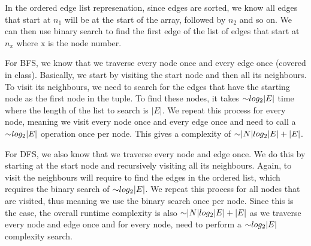 \begin{problem}
\begin{questions}
In the ordered edge list represenation, since edges are sorted, we know all edges that start at $n_1$ will be at the start of the array, followed by $n_2$ and so on. We can then use binary search to find the first edge of the list of edges that start at $n_x$ where x is the node number. 

For BFS, we know that we traverse every node once and every edge once (covered in class). Basically, we start by visiting the start node and then all its neighbours. To visit its neighbours, we need to search for the edges that have the starting node as the first node in the tuple. To find these nodes, it takes $\mathord{\sim}log_2{|E|}$ time where the length of the list to search is $|E|$. We repeat this process for every node, meaning we visit every node once and every edge once and need to call a $\mathord{\sim}log_2{|E|}$ operation once per node. This gives a complexity of $\mathord{\sim}|N|log_2|E| + |E|$.

For DFS, we also know that we traverse every node and edge once. We do this by starting at the start node and recursively visiting all its neighbours. Again, to visit the neighbours will require to find the edges in the ordered list, which requires the binary search of $\mathord{\sim}log_2{|E|}$. We repeat this process for all nodes that are visited, thus meaning we use the binary search once per node. Since this is the case, the overall runtime complexity is also $\mathord{\sim}|N|log_2|E| + |E|$ as we traverse every node and edge once and for every node, need to perform a $\mathord{\sim}log_2{|E|}$ complexity search.

\end{questions}
\end{problem}

